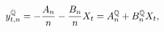 \begin{equation*}
	y_{t,n}^{\mathbb{Q}} = - \frac{A_{n}}{n} - \frac{B_{n}}{n} X_{t} = A_{n}^{\mathbb{Q}} + B_{n}^{\mathbb{Q}} X_{t},
\end{equation*}